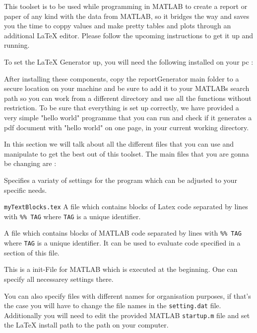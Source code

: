 
This toolset is to be used while programming in MATLAB to create a report or paper of any
kind with the data from MATLAB, so it bridges the way and saves you the time to coppy
values and make pretty tables and plots through an additional LaTeX editor. Please follow the
upcoming instructions to get it up and running.


To set the LaTeX Generator up, you will need the following installed on your pc :


After installing these components, copy the reportGenerator main folder to a secure location
on your machine and be sure to add it to your MATLABs search path so you can work from
a different directory and use all the functions without restriction. To be sure that everything
is set up correctly, we have provided a very simple "hello world" programme that you can run
and check if it generates a pdf document with "hello world" on one page, in your current working
directory.


In this section we will talk about all the different files that you can use and manipulate to 
get the best out of this toolset. The main files that you are gonna be changing are :

\begin{description}
\item[{\tt setting.dat}] Specifies a variaty of settings for the program which can be adjusted 
to your specific needs.
\item{{\tt myTextBlocks.tex}} A file which contains blocks of Latex code 
separated by lines with {\tt \%\% TAG} where {\tt TAG} is a unique identifier.
\item[{\tt myCodeBlocks.m}] A file which contains blocks of MATLAB code 
separated by lines with {\tt \%\% TAG} where {\tt TAG} is a unique identifier.
It can be used to evaluate code specified in a section of this file.
\item[{\tt myMatlabInit.m}] This is a init-File for MATLAB which is executed 
at the beginning. One can specify all necessarey settings there.
\end{description}

You can also specify files with different names for organisation purposes, if that's the case
you will have to change the file names in the {\tt setting.dat} file.
Additionally you will need to edit the provided MATLAB {\tt startup.m} file and set the \LaTeX{} 
install path to the path on your computer.



